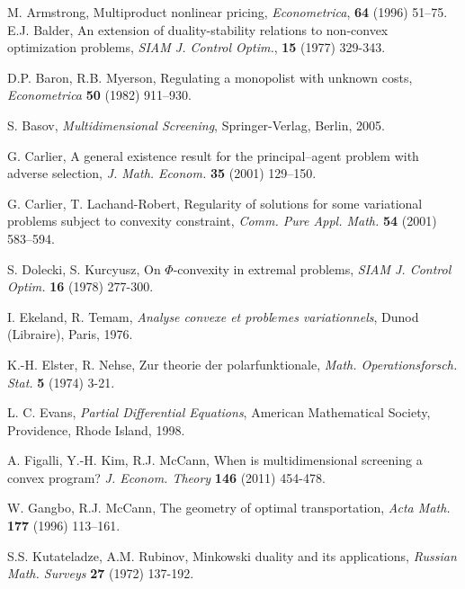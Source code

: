 \documentclass[a4paper, 11pt]{amsart}
\numberwithin{equation}{section}
\theoremstyle{plain}
\theoremstyle{definition}
\theoremstyle{remark}
\begin{document}
\begin{thebibliography}{BCDE}
	
{	 
	M. Armstrong, 
	Multiproduct nonlinear pricing, 
	{\em Econometrica}, {\bf 64 }(1996) 51–75.
}	
		E.J. Balder, 
		An extension of duality-stability relations to non-convex optimization problems, 
		{\em SIAM J. Control Optim.}, {\bf 15} (1977) 329-343.
	
	D.P. Baron, R.B. Myerson, 
	Regulating a monopolist with unknown costs, 
	{\em Econometrica} {\bf 50} (1982) 911–930.
	
	S. Basov, 
	{\em Multidimensional Screening}, 
	Springer-Verlag, Berlin, 2005.
	
	G. Carlier, 
	A general existence result for the principal–agent problem with adverse selection, 
	{\em J. Math. Econom.} {\bf 35} (2001) 129–150.
	
	G. Carlier, T. Lachand-Robert, 
	Regularity of solutions for some variational problems subject to convexity constraint, 
	{\em Comm. Pure Appl. Math.} {\bf 54} (2001) 583–594.
	
{	 
	S. Dolecki, S. Kurcyusz, 
	On $\Phi$-convexity in extremal problems, 
	{\em SIAM J. Control Optim.} {\bf 16} (1978)  277-300.
}

	I. Ekeland, R. Temam,
	 {\em Analyse convexe et probl$\acute{e}$mes variationnels},
	 Dunod (Libraire), Paris, 1976.

{
	K.-H. Elster, R. Nehse, 
	Zur theorie der polarfunktionale, 
	{\em Math. Operationsforsch. Stat.} {\bf 5} (1974) 3-21.
}

	L. C. Evans, 
	{\em Partial Differential Equations},
	American Mathematical Society, Providence, Rhode Island, 1998.
	

	A. Figalli, Y.-H. Kim, R.J. McCann, 
	When is multidimensional screening a convex program? 
	{\em J. Econom. Theory} {\bf 146} (2011) 454-478.
	
{	 
	W. Gangbo, R.J. McCann, 
	The geometry of optimal transportation, 
	{\em Acta Math.} {\bf 177} (1996) 113–161.
}
	

{
	S.S. Kutateladze, A.M. Rubinov, 
	Minkowski duality and its applications, 
	{\em Russian Math. Surveys} {\bf 27}  (1972) 137-192.
}


\end{thebibliography}
\end{document}
